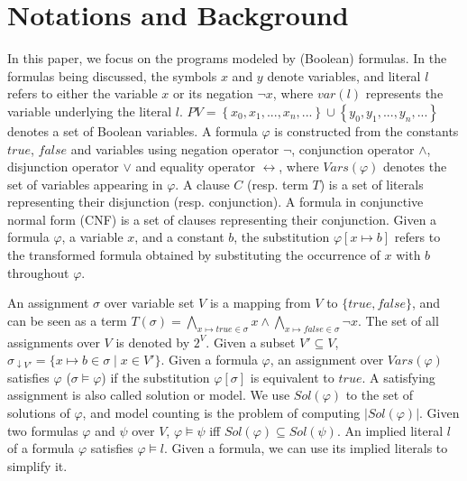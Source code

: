 

\section{Notations and Background}
\label{sec:Notation}

In this paper, we focus on the programs modeled by (Boolean) formulas.
In the formulas being discussed, the symbols $x$ and $y$ denote variables, and literal $l$ refers to either the variable $x$ or its negation $\neg x$, where $var(l)$ represents the variable underlying the literal $l$.
$PV = \left\{x_0,x_1,...,x_n,... \right\} \cup \left\{y_0,y_1,...,y_n,... \right\}$ denotes a set of Boolean variables.
A formula $\varphi$ is constructed from the constants $\mathit{true}$, $\mathit{false}$ and variables using negation operator $\neg$, conjunction operator $\wedge$, disjunction operator $\vee$ and equality operator $\leftrightarrow$, where $\mathit{Vars}(\varphi)$ denotes the set of variables appearing in $\varphi$.
A clause $C$ (resp. term $T$) is a set of literals representing their disjunction (resp. conjunction).
A formula in conjunctive normal form (CNF) is a set of clauses representing their conjunction.
Given a formula $\varphi$, a variable $x$, and a constant $b$, the substitution $\varphi[x \mapsto b]$ refers to the transformed formula obtained by substituting the occurrence of $x$ with $b$ throughout $\varphi$.

An assignment $\sigma$ over variable set $V$ is a mapping from $V$ to $\{ \mathit{true}, \mathit{false} \}$, and can be seen as a term $T(\sigma) = \bigwedge_{x \mapsto \mathit{true} \in \sigma} x \land \bigwedge_{x \mapsto \mathit{false} \in \sigma} \lnot x$.
The set of all assignments over $V$ is denoted by $2^V$.
Given a subset $V' \subseteq V$, $\sigma_{\downarrow V'} = \{x \mapsto b \in \sigma \mid x \in V'\}$.
Given a formula $\varphi$, an assignment over $\mathit{Vars}(\varphi)$ satisfies $\varphi$ ($\sigma \models \varphi$) if the substitution $\varphi[\sigma]$ is equivalent to $\mathit{true}$.
A satisfying assignment is also called solution or model.
We use $\mathit{Sol}(\varphi)$ to the set of solutions of $\varphi$, and model counting is the problem of computing $|\mathit{Sol}(\varphi)|$.   
Given two formulas $\varphi$ and $\psi$ over $V$, $\varphi \models \psi$ iff $\mathit{Sol}(\varphi) \subseteq \mathit{Sol}(\psi)$.
An implied literal $l$ of a formula $\varphi$ satisfies $\varphi \models l$. 
Given a formula, we can use its implied literals to simplify it.

